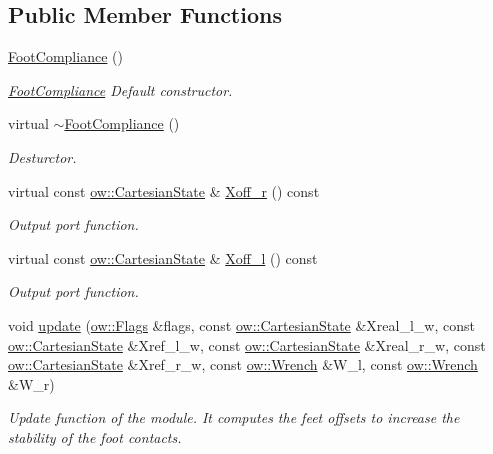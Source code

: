 \subsection*{Public Member Functions}
\begin{DoxyCompactItemize}
\item 
\hyperlink{classow__fcm_1_1FootCompliance_abb9dd0c9887073418f4a85d3eb3435de}{Foot\+Compliance} ()\hypertarget{classow__fcm_1_1FootCompliance_abb9dd0c9887073418f4a85d3eb3435de}{}\label{classow__fcm_1_1FootCompliance_abb9dd0c9887073418f4a85d3eb3435de}

\begin{DoxyCompactList}\small\item\em \hyperlink{classow__fcm_1_1FootCompliance}{Foot\+Compliance} Default constructor. \end{DoxyCompactList}\item 
virtual \hyperlink{classow__fcm_1_1FootCompliance_afee130369009c5beb18460be71273cd4}{$\sim$\+Foot\+Compliance} ()\hypertarget{classow__fcm_1_1FootCompliance_afee130369009c5beb18460be71273cd4}{}\label{classow__fcm_1_1FootCompliance_afee130369009c5beb18460be71273cd4}

\begin{DoxyCompactList}\small\item\em Desturctor. \end{DoxyCompactList}\item 
virtual const \hyperlink{classow__core_1_1CartesianState}{ow\+::\+Cartesian\+State} \& \hyperlink{classow__fcm_1_1FootCompliance_a660d26f9b3e73e979d05c9ab0a3957da}{Xoff\+\_\+r} () const 
\begin{DoxyCompactList}\small\item\em Output port function. \end{DoxyCompactList}\item 
virtual const \hyperlink{classow__core_1_1CartesianState}{ow\+::\+Cartesian\+State} \& \hyperlink{classow__fcm_1_1FootCompliance_a9a78316d9d612e7854b94c2f0212d534}{Xoff\+\_\+l} () const 
\begin{DoxyCompactList}\small\item\em Output port function. \end{DoxyCompactList}\item 
void \hyperlink{classow__fcm_1_1FootCompliance_a565f127b94b78e4e4a35fb7563a844db}{update} (\hyperlink{classow__core_1_1Flags}{ow\+::\+Flags} \&flags, const \hyperlink{classow__core_1_1CartesianState}{ow\+::\+Cartesian\+State} \&Xreal\+\_\+l\+\_\+w, const \hyperlink{classow__core_1_1CartesianState}{ow\+::\+Cartesian\+State} \&Xref\+\_\+l\+\_\+w, const \hyperlink{classow__core_1_1CartesianState}{ow\+::\+Cartesian\+State} \&Xreal\+\_\+r\+\_\+w, const \hyperlink{classow__core_1_1CartesianState}{ow\+::\+Cartesian\+State} \&Xref\+\_\+r\+\_\+w, const \hyperlink{classow__core_1_1Wrench}{ow\+::\+Wrench} \&W\+\_\+l, const \hyperlink{classow__core_1_1Wrench}{ow\+::\+Wrench} \&W\+\_\+r)
\begin{DoxyCompactList}\small\item\em Update function of the module. It computes the feet offsets to increase the stability of the foot contacts. \end{DoxyCompactList}\end{DoxyCompactItemize}
